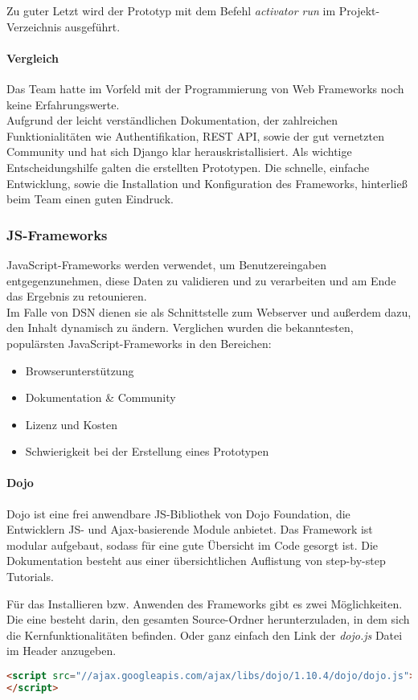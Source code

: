 Zu guter Letzt wird der Prototyp mit dem Befehl \textit{activator run} im Projekt-Verzeichnis ausgeführt.

\paragraph{Vergleich}
Das Team hatte im Vorfeld mit der Programmierung von Web Frameworks noch keine Erfahrungswerte. \\
Aufgrund der leicht verständlichen Dokumentation, der zahlreichen Funktionialitäten wie Authentifikation, REST API, sowie der gut vernetzten Community und hat sich Django klar herauskristallisiert. Als wichtige Entscheidungshilfe galten die erstellten Prototypen. Die schnelle, einfache Entwicklung, sowie die Installation und Konfiguration des Frameworks, hinterließ beim Team einen guten Eindruck.

\subsubsection{JS-Frameworks}
JavaScript-Frameworks werden verwendet, um Benutzereingaben entgegenzunehmen, diese Daten zu validieren und zu verarbeiten und am Ende das Ergebnis zu retounieren.\\
Im Falle von DSN dienen sie als Schnittstelle zum Webserver und außerdem dazu, den Inhalt dynamisch zu ändern. Verglichen wurden die bekanntesten, populärsten JavaScript-Frameworks in den Bereichen:
\begin{itemize}
\item Browserunterstützung
\item Dokumentation \& Community
\item Lizenz und Kosten
\item Schwierigkeit bei der Erstellung eines Prototypen
\end{itemize}
\paragraph{Dojo}
Dojo ist eine frei anwendbare JS-Bibliothek von Dojo Foundation, die Entwicklern JS- und Ajax-basierende Module anbietet. Das Framework ist modular aufgebaut, sodass für eine gute Übersicht im Code gesorgt ist. Die Dokumentation besteht aus einer übersichtlichen Auflistung von step-by-step Tutorials. \cite{DOJO}

Für das Installieren bzw. Anwenden des Frameworks gibt es zwei Möglichkeiten. Die eine besteht darin, den gesamten Source-Ordner herunterzuladen, in dem sich die Kernfunktionalitäten befinden. Oder ganz einfach den Link der \textit{dojo.js} Datei im Header anzugeben.
\begin{lstlisting}[caption={Dojo einbinden\cite{DOJODOWN}}, language=HTML]
<script src="//ajax.googleapis.com/ajax/libs/dojo/1.10.4/dojo/dojo.js">
</script>
\end{lstlisting}

